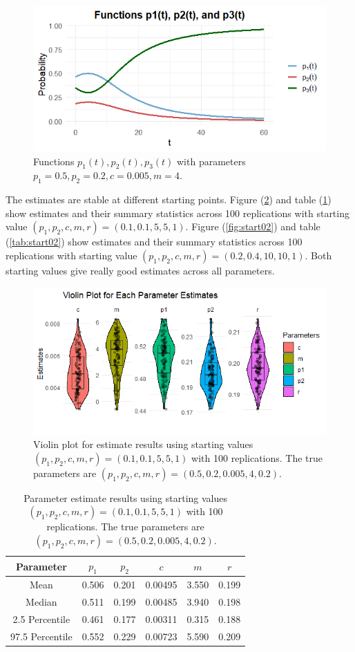 \documentclass[11pt]{article}
\begin{document}
\begin{figure}[!ht]
    \centering
    \includegraphics[width=0.75\linewidth]{prob_plot_05020005402.png}
    \caption{Functions $p_1(t), p_2(t), p_3(t)$ with parameters $p_1 = 0.5, p_2 = 0.2, c = 0.005, m = 4.$}
    \label{fig:prob_function}
\end{figure}
The estimates are stable at different starting points. Figure (\ref{fig:start01}) and table (\ref{tab:start01}) show estimates and their summary statistics across 100 replications with starting value $(p_1, p_2, c, m,r) = (0.1, 0.1, 5, 5, 1)$. Figure (\ref{fig:start02}) and table (\ref{tab:start02}) show estimates and their summary statistics across 100 replications with starting value $(p_1, p_2, c, m,r) = (0.2, 0.4, 10, 10, 1)$. Both starting values give really good estimates across all parameters.
\begin{figure}[!ht]
    \centering
    \includegraphics[width=0.75\linewidth]{start01_05020005402.png}
    \caption{Violin plot for estimate results using starting values $(p_1, p_2, c, m,r) = (0.1, 0.1, 5, 5, 1)$ with 100 replications. The true parameters are $(p_1, p_2, c, m,r) = (0.5, 0.2, 0.005, 4, 0.2)$.}
    \label{fig:start01}
\end{figure}
\begin{table}[!ht]
    \centering
    \begin{tabular}{|c|c|c|c|c|c|}
    \hline
         Parameter& $p_1$ & $p_2$ &$c$  & $m$ & $r$\\
         \hline
         Mean &  0.506 & 0.201 & 0.00495 & 3.550 & 0.199\\
         Median& 0.511 & 0.199 & 0.00485 & 3.940 & 0.198 \\
         2.5 Percentile& 0.461 & 0.177 & 0.00311 & 0.315 & 0.188 \\
         97.5 Percentile& 0.552 & 0.229 & 0.00723 & 5.590 & 0.209\\
         \hline
    \end{tabular}
    \caption{Parameter estimate results using starting values $(p_1, p_2, c, m,r) = (0.1, 0.1, 5, 5, 1)$ with 100 replications. The true parameters are $(p_1, p_2, c, m,r) = (0.5, 0.2, 0.005, 4, 0.2)$.}
    \label{tab:start01}
\end{table}
\end{document}
